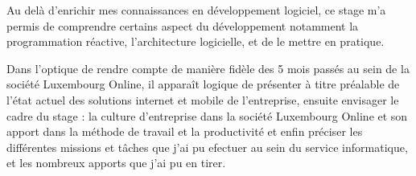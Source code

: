 	Au delà d'enrichir mes connaissances en développement logiciel, ce stage m'a permis de comprendre certains aspect du développement notamment la programmation réactive, l'architecture logicielle,  et de le mettre en pratique.
	
	Dans l'optique de rendre compte de manière fidèle des 5 mois passés au sein de la société  Luxembourg Online, il apparaît logique de présenter à titre préalable de l'état actuel des solutions internet et mobile de l'entreprise, ensuite envisager le cadre du stage : la culture d'entreprise dans la société Luxembourg Online et son apport dans la méthode de travail et la productivité et enfin préciser les différentes missions et tâches que j'ai pu efectuer au sein du service informatique, et les nombreux apports que j'ai pu en tirer.
